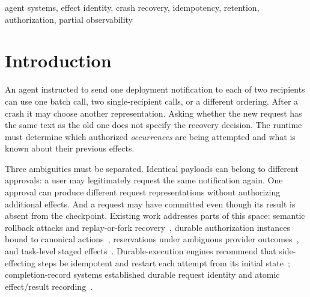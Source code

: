 \documentclass[conference,10pt]{IEEEtran}
\begin{document}
\begin{abstract}
stop-on-failure) when finality is provided per request, and to $4.5$ and $4.9$ of $8$ when every fresh dispatch must be preceded by a per-key fence and the policy minimises that total; a journal-driven recovery worker reproduces these counts on the runtime, and a misdeclared class produces false completion. A takeover study across three provider profiles shows where a fence, an evidence lookup and an explicit unresolved state each do work the others do not, and a resumed-predecessor study shows that a stale worker's receipt is evidence the controller can adopt without weakening its lease rule. No live LLM, commercial provider call, universal exactly-once guarantee or superiority over published systems is claimed.
\end{abstract}

\begin{IEEEkeywords}
agent systems, effect identity, crash recovery, idempotency, retention, authorization, partial observability
\end{IEEEkeywords}

\section{Introduction}

An agent instructed to send one deployment notification to each of two recipients can use one batch call, two single-recipient calls, or a different ordering. After a crash it may choose another representation. Asking whether the new request has the same text as the old one does not specify the recovery decision. The runtime must determine which authorized \emph{occurrences} are being attempted and what is known about their previous effects.

Three ambiguities must be separated. Identical payloads can belong to different approvals: a user may legitimately request the same notification again. One approval can produce different request representations without authorizing additional effects. And a request may have committed even though its result is absent from the checkpoint. Existing work addresses parts of this space: semantic rollback attacks and replay-or-fork recovery~\cite{acrfence}, durable authorization instances bound to canonical actions~\cite{caplease}, reservations under ambiguous provider outcomes~\cite{aidguard}, and task-level staged effects~\cite{cordon}. Durable-execution engines recommend that side-effecting steps be idempotent and restart each attempt from its initial state~\cite{temporal}; completion-record systems established durable request identity and atomic effect/result recording~\cite{rifl}.
\end{document}
